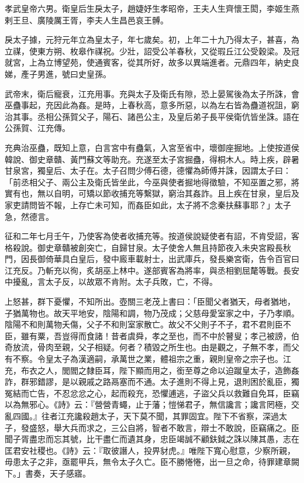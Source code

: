 
\begin{pinyinscope}
孝武皇帝六男。衛皇后生戾太子，趙婕妤生孝昭帝，王夫人生齊懷王閎，李姬生燕剌王旦、廣陵厲王胥，李夫人生昌邑哀王髆。

戾太子據，元狩元年立為皇太子，年七歲矣。初，上年二十九乃得太子，甚喜，為立禖，使東方朔、枚皋作禖祝。少壯，詔受公羊春秋，又從瑕丘江公受穀梁。及冠就宮，上為立博望苑，使通賓客，從其所好，故多以異端進者。元鼎四年，納史良娣，產子男進，號曰史皇孫。

武帝末，衛后寵衰，江充用事。充與太子及衛氏有隙，恐上晏駕後為太子所誅，會巫蠱事起，充因此為姦。是時，上春秋高，意多所惡，以為左右皆為蠱道祝詛，窮治其事。丞相公孫賀父子，陽石、諸邑公主，及皇后弟子長平侯衛伉皆坐誅。語在公孫賀、江充傳。

充典治巫蠱，既知上意，白言宮中有蠱氣，入宮至省中，壞御座掘地。上使按道侯韓說、御史章贛、黃門蘇文等助充。充遂至太子宮掘蠱，得桐木人。時上疾，辟暑甘泉宮，獨皇后、太子在。太子召問少傅石德，德懼為師傅并誅，因謂太子曰：「前丞相父子、兩公主及衛氏皆坐此，今巫與使者掘地得徵驗，不知巫置之邪，將實有也，無以自明，可矯以節收捕充等繫獄，窮治其姦詐。且上疾在甘泉，皇后及家吏請問皆不報，上存亡未可知，而姦臣如此，太子將不念秦扶蘇事耶？」太子急，然德言。

征和二年七月壬午，乃使客為使者收捕充等。按道侯說疑使者有詔，不肯受詔，客格殺說。御史章贛被創突亡，自歸甘泉。太子使舍人無且持節夜入未央宮殿長秋門，因長御倚華具白皇后，發中廄車載射士，出武庫兵，發長樂宮衛，告令百官曰江充反。乃斬充以徇，炙胡巫上林中。遂部賓客為將率，與丞相劉屈氂等戰。長安中擾亂，言太子反，以故眾不肯附。太子兵敗，亡，不得。

上怒甚，群下憂懼，不知所出。壺關三老茂上書曰：「臣聞父者猶天，母者猶地，子猶萬物也。故天平地安，陰陽和調，物乃茂成；父慈母愛室家之中，子乃孝順。陰陽不和則萬物夭傷，父子不和則室家散亡。故父不父則子不子，君不君則臣不臣，雖有粟，吾豈得而食諸！昔者虞舜，孝之至也，而不中於瞽叟；孝己被謗，伯奇放流，骨肉至親，父子相疑。何者？積毀之所生也。由是觀之，子無不孝，而父有不察。令皇太子為漢適嗣，承萬世之業，體祖宗之重，親則皇帝之宗子也。江充，布衣之人，閭閻之隸臣耳，陛下顯而用之，銜至尊之命以迫蹴皇太子，造飾姦詐，群邪錯謬，是以親戚之路鬲塞而不通。太子進則不得上見，退則困於亂臣，獨冤結而亡告，不忍忿忿之心，起而殺充，恐懼逋逃，子盜父兵以救難自免耳，臣竊以為無邪心。《詩》云：『營營青蠅，止于藩；愷悌君子，無信讒言；讒言罔極，交亂四國。』往者江充讒殺趙太子，天下莫不聞，其罪固宜。陛下不省察，深過太子，發盛怒，舉大兵而求之，三公自將，智者不敢言，辯士不敢說，臣竊痛之。臣聞子胥盡忠而忘其號，比干盡仁而遺其身，忠臣竭誠不顧鈇鉞之誅以陳其愚，志在匡君安社稷也。《詩》云：『取彼譖人，投畀豺虎。』唯陛下寬心慰意，少察所親，毋患太子之非，亟罷甲兵，無令太子久亡。臣不勝惓惓，出一旦之命，待罪建章闕下。」書奏，天子感寤。


\end{pinyinscope}
